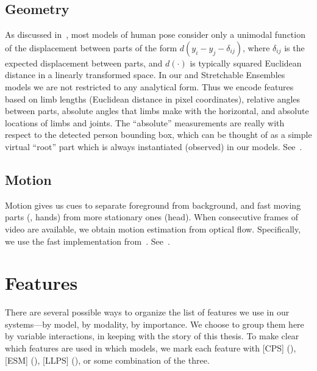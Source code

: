 \section{Geometry}\label{sec:geom}
As discussed in~, most models of human pose consider only a unimodal 
function of the displacement between parts of the form $d(y_i - y_j - 
\delta_{ij})$, where $\delta_{ij}$ is the expected displacement between parts, 
and $d(\cdot)$ is typically squared Euclidean distance in a linearly 
transformed space.  In our \CPS and Stretchable Ensembles models we are not restricted to any analytical form.  
Thus we encode features based on limb lengths (Euclidean distance in pixel 
coordinates), relative angles between parts, absolute angles that limbs make 
with the horizontal, and absolute locations of limbs and joints.  The 
``absolute'' measurements are really with respect to the detected person 
bounding box, which can be thought of as a simple virtual ``root'' part which 
is always instantiated (observed) in our models.  
See~.

\section{Motion}\label{sec:motion} Motion gives us cues to separate foreground 
from background, and fast moving parts (\eg, hands) from more stationary ones 
(\eg head).  When consecutive frames of video are available, we obtain motion 
estimation from optical flow.  Specifically, we use the fast implementation 
from~\citet{liu-optflow}.  See~.




\chapter{Features}\label{sec:features2}

There are several possible ways to organize the list of features we use in our 
systems---by model, by modality, by importance.  We choose to group them 
here by variable interactions, in keeping with the story of this thesis.  To 
make clear which features are used in which models, we mark each feature with 
[CPS] (), [ESM] (), [LLPS] (), or 
some combination of the three.

